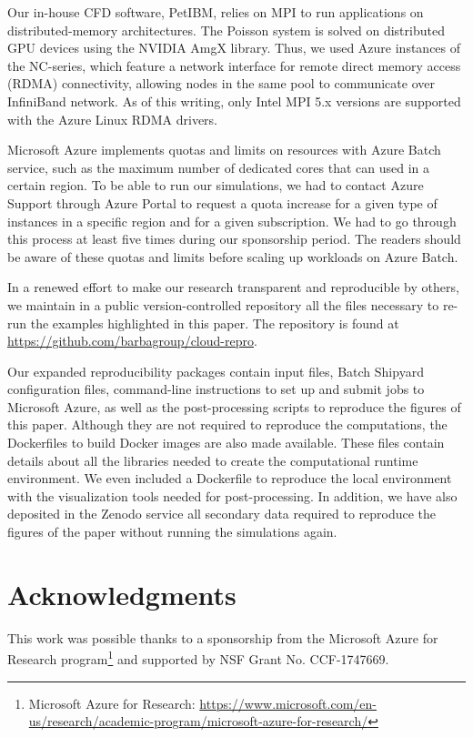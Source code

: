 \documentclass[10pt,journal,compsoc]{IEEEtran}
\begin{document}
Our in-house CFD software, PetIBM, relies on MPI to run applications on distributed-memory architectures.
The Poisson system is solved on distributed GPU devices using the NVIDIA AmgX library.
Thus, we used Azure instances of the NC-series, which feature a network interface for remote direct memory access (RDMA) connectivity, allowing nodes in the same pool to communicate over InfiniBand network.
As of this writing, only Intel MPI 5.x versions are supported with the Azure Linux RDMA drivers.

Microsoft Azure implements quotas and limits on resources with Azure Batch service, such as the maximum number of dedicated cores that can used in a certain region.
To be able to run our simulations, we had to contact Azure Support through Azure Portal to request a quota increase for a given type of instances in a specific region and for a given subscription.
We had to go through this process at least five times during our sponsorship period.
The readers should be aware of these quotas and limits before scaling up workloads on Azure Batch.

In a renewed effort to make our research transparent and reproducible by others, we maintain in a public version-controlled repository all the files necessary to re-run the examples highlighted in this paper.
The repository is found at \url{https://github.com/barbagroup/cloud-repro}.

Our expanded reproducibility packages contain input files, Batch Shipyard configuration files, command-line instructions to set up and submit jobs to Microsoft Azure, as well as the post-processing scripts to reproduce the figures of this paper.
Although they are not required to reproduce the computations, the Dockerfiles to build Docker images are also made available. 
These files contain details about all the libraries needed to create the computational runtime environment.
We even included a Dockerfile to reproduce the local environment with the visualization tools needed for post-processing.
In addition, we have also deposited in the Zenodo service all secondary data required to reproduce the figures of the paper without running the simulations again.

\section*{Acknowledgments}

This work was possible thanks to a sponsorship from the Microsoft Azure for Research program\footnote{Microsoft Azure for Research: \url{https://www.microsoft.com/en-us/research/academic-program/microsoft-azure-for-research/}} and supported by NSF Grant No. CCF-1747669.



%
\end{document}
